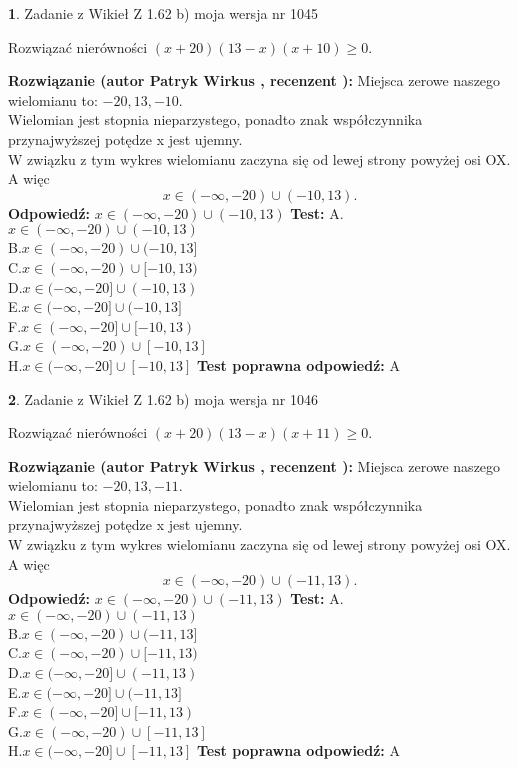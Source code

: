 \documentclass[12pt, a4paper]{article}
\theoremstyle{definition} %
\newtheorem{zad}{}
\newcommand{\zadStart}[1]{\begin{zad}#1\newline}
\newcommand{\zadStop}{\end{zad}}
\newcommand{\rozwStart}[2]{\noindent \textbf{Rozwiązanie (autor #1 , recenzent #2): }\newline}
\newcommand{\rozwStop}{\newline}
\newcommand{\odpStart}{\noindent \textbf{Odpowiedź:}\newline}
\newcommand{\odpStop}{\newline}
\newcommand{\testStart}{\noindent \textbf{Test:}\newline}
\newcommand{\testStop}{\newline}
\newcommand{\kluczStart}{\noindent \textbf{Test poprawna odpowiedź:}\newline}
\newcommand{\kluczStop}{\newline}
\begin{document}
\zadStart{Zadanie z Wikieł Z 1.62 b) moja wersja nr 1045}

Rozwiązać nierówności $(x+20)(13-x)(x+10)\ge0$.
\zadStop
\rozwStart{Patryk Wirkus}{}
Miejsca zerowe naszego wielomianu to: $-20, 13, -10$.\\
Wielomian jest stopnia nieparzystego, ponadto znak współczynnika przy\linebreak najwyższej potędze x jest ujemny.\\ W związku z tym wykres wielomianu zaczyna się od lewej strony powyżej osi OX. A więc $$x \in (-\infty,-20) \cup (-10,13).$$
\rozwStop
\odpStart
$x \in (-\infty,-20) \cup (-10,13)$
\odpStop
\testStart
A.$x \in (-\infty,-20) \cup (-10,13)$\\
B.$x \in (-\infty,-20) \cup (-10,13]$\\
C.$x \in (-\infty,-20) \cup [-10,13)$\\
D.$x \in (-\infty,-20] \cup (-10,13)$\\
E.$x \in (-\infty,-20] \cup (-10,13]$\\
F.$x \in (-\infty,-20] \cup [-10,13)$\\
G.$x \in (-\infty,-20) \cup [-10,13]$\\
H.$x \in (-\infty,-20] \cup [-10,13]$
\testStop
\kluczStart
A
\kluczStop



\zadStart{Zadanie z Wikieł Z 1.62 b) moja wersja nr 1046}

Rozwiązać nierówności $(x+20)(13-x)(x+11)\ge0$.
\zadStop
\rozwStart{Patryk Wirkus}{}
Miejsca zerowe naszego wielomianu to: $-20, 13, -11$.\\
Wielomian jest stopnia nieparzystego, ponadto znak współczynnika przy\linebreak najwyższej potędze x jest ujemny.\\ W związku z tym wykres wielomianu zaczyna się od lewej strony powyżej osi OX. A więc $$x \in (-\infty,-20) \cup (-11,13).$$
\rozwStop
\odpStart
$x \in (-\infty,-20) \cup (-11,13)$
\odpStop
\testStart
A.$x \in (-\infty,-20) \cup (-11,13)$\\
B.$x \in (-\infty,-20) \cup (-11,13]$\\
C.$x \in (-\infty,-20) \cup [-11,13)$\\
D.$x \in (-\infty,-20] \cup (-11,13)$\\
E.$x \in (-\infty,-20] \cup (-11,13]$\\
F.$x \in (-\infty,-20] \cup [-11,13)$\\
G.$x \in (-\infty,-20) \cup [-11,13]$\\
H.$x \in (-\infty,-20] \cup [-11,13]$
\testStop
\kluczStart
A
\kluczStop
\end{document}
